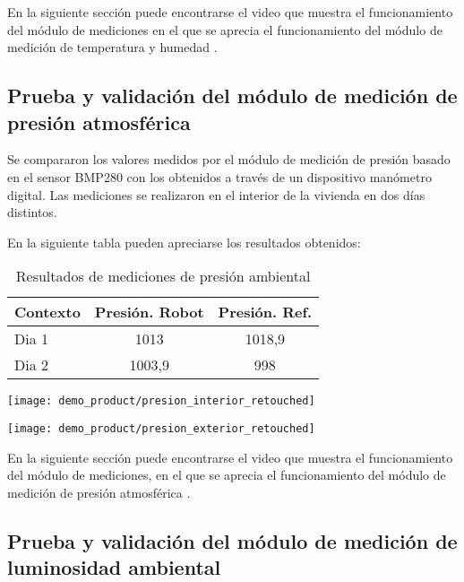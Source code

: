 En la siguiente sección puede encontrarse el video que muestra el funcionamiento del módulo de mediciones en el que se aprecia el funcionamiento del módulo de medición de temperatura y humedad \cite{Demo_Mediciones}.

\subsection{Prueba y validación del módulo de medición de presión atmosférica}

Se compararon los valores medidos por el módulo de medición de presión basado en el sensor BMP280 con los obtenidos a través de un dispositivo manómetro digital. Las mediciones se realizaron en el interior de la vivienda en dos días distintos.

En la siguiente tabla pueden apreciarse los resultados obtenidos:

\begin{table}[h]
\centering
\caption[Resultados de mediciones de presión ambiental.]{Resultados de mediciones de presión ambiental}
\begin{tabular}{l c c}
\toprule
\textbf{Contexto} & \textbf{Presión. Robot} & \textbf{Presión. Ref.} \\
\midrule
Dia 1 & 1013 & 1018,9 \\
Dia 2 & 1003,9 & 998 \\
\bottomrule
\hline
\end{tabular}
\end{table}

\begin{center}
\texttt{[image: demo\_product/presion\_interior\_retouched]}
  \label{fig:humedad_interior}
\end{center}

\begin{center}
\texttt{[image: demo\_product/presion\_exterior\_retouched]}
  \label{fig:humedad_interior}
\end{center}

En la siguiente sección puede encontrarse el video que muestra el funcionamiento del módulo de mediciones, en el que se aprecia el funcionamiento del módulo de medición de presión atmosférica \cite{Demo_Mediciones}.

\subsection{Prueba y validación del módulo de medición de luminosidad ambiental}

